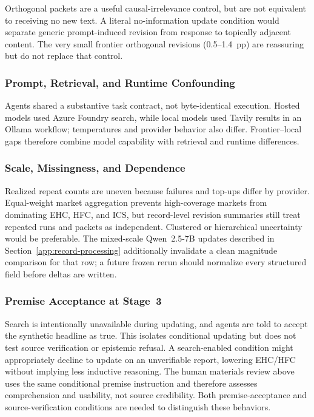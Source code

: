Orthogonal packets are a useful causal-irrelevance control, but are not equivalent to
receiving no new text.  A literal no-information update condition would separate
generic prompt-induced revision from response to topically adjacent content.  The very
small frontier orthogonal revisions (0.5--1.4~pp) are reassuring but do not replace
that control.

\subsubsection{Prompt, Retrieval, and Runtime Confounding}
Agents shared a substantive task contract, not byte-identical execution. Hosted
models used Azure Foundry search, while local models used Tavily results in an
Ollama workflow; temperatures and provider behavior also differ. Frontier--local
gaps therefore combine model capability with retrieval and runtime differences.

\subsubsection{Scale, Missingness, and Dependence}
Realized repeat counts are uneven because failures and top-ups differ by provider.
Equal-weight market aggregation prevents high-coverage markets from dominating EHC,
HFC, and ICS, but record-level revision summaries still treat repeated runs and packets
as independent.  Clustered or hierarchical uncertainty would be preferable.  The
mixed-scale Qwen~2.5-7B updates described in
Section~\ref{app:record-processing} additionally invalidate a clean magnitude
comparison for that row; a future frozen rerun should normalize every structured field
before deltas are written.

\subsubsection{Premise Acceptance at Stage~3}
Search is intentionally unavailable during updating, and agents are told to accept the
synthetic headline as true.  This isolates conditional updating but does not test source
verification or epistemic refusal.  A search-enabled condition might appropriately
decline to update on an unverifiable report, lowering EHC/HFC without implying less
inductive reasoning. The human materials review above uses the same conditional
premise instruction and therefore assesses comprehension and usability, not
source credibility. Both premise-acceptance and source-verification conditions
are needed to distinguish these behaviors.

